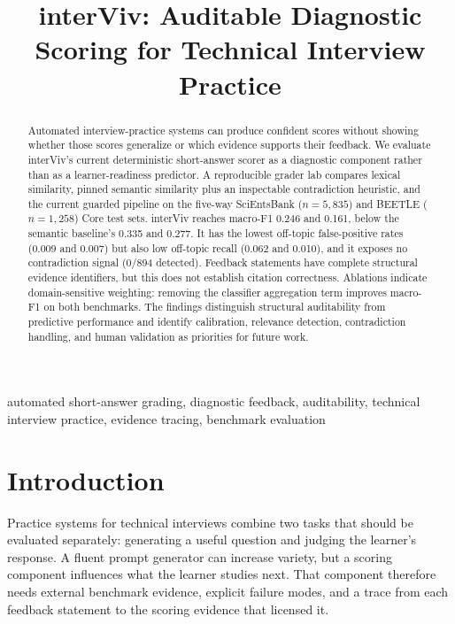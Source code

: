 \documentclass[conference,a4paper]{IEEEtran}
\title{interViv: Auditable Diagnostic Scoring for Technical Interview Practice}
\author{\IEEEauthorblockN{Anonymous Submission}}
\begin{document}
\maketitle

\begin{abstract}
Automated interview-practice systems can produce confident scores without
showing whether those scores generalize or which evidence supports their
feedback. We evaluate interViv's current deterministic short-answer scorer as
a diagnostic component rather than as a learner-readiness predictor. A
reproducible grader lab compares lexical similarity, pinned semantic similarity
plus an inspectable contradiction heuristic, and the current guarded pipeline
on the five-way SciEntsBank ($n=5{,}835$) and BEETLE ($n=1{,}258$) Core test
sets. interViv reaches macro-F1 0.246 and 0.161, below the semantic baseline's
0.335 and 0.277. It has the lowest off-topic false-positive rates (0.009 and
0.007) but also low off-topic recall (0.062 and 0.010), and it exposes no
contradiction signal (0/894 detected). Feedback statements have complete
structural evidence identifiers, but this does not establish citation
correctness. Ablations indicate domain-sensitive weighting: removing the
classifier aggregation term improves macro-F1 on both benchmarks. The findings
distinguish structural auditability from predictive performance and identify
calibration, relevance detection, contradiction handling, and human validation
as priorities for future work.
\end{abstract}

\begin{IEEEkeywords}
automated short-answer grading, diagnostic feedback, auditability, technical
interview practice, evidence tracing, benchmark evaluation
\end{IEEEkeywords}

\section{Introduction}

Practice systems for technical interviews combine two tasks that should be
evaluated separately: generating a useful question and judging the learner's
response. A fluent prompt generator can increase variety, but a scoring
component influences what the learner studies next. That component therefore
needs external benchmark evidence, explicit failure modes, and a trace from
each feedback statement to the scoring evidence that licensed it.
\end{document}
